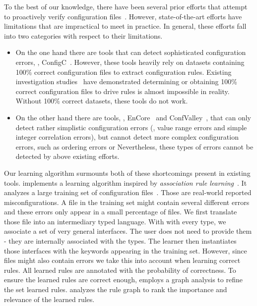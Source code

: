 To the best of our knowledge, there have been several prior efforts that attempt to proactively verify 
configuration files~\cite{santolucitoCAV, xu16early,
zhang14encore, huang15confvalley}.
However, state-of-the-art efforts have limitations that are impractical to meet in practice.
In general, these efforts fall into two categories with respect to their limitations.\begin{itemize}
\item On the one hand there are tools that can detect sophisticated 
configuration errors, \eg, ConfigC~\cite{santolucitoCAV}. 
However, these tools heavily rely on datasets containing 100\% 
correct configuration files to extract configuration rules.
Existing investigation studies~\cite{wang04automatic, yin11anempirical}
have demonstrated determining or obtaining 100\% correct configuration
files to drive rules is almost impossible in reality. 
Without 100\% correct datasets, these tools do not work.
\item On the other hand there are tools, 
\eg, EnCore~\cite{zhang14encore} and
ConfValley~\cite{huang15confvalley}, that can only 
detect rather simplistic configuration errors (\eg, value range errors 
and simple integer correlation errors), but cannot detect
more complex configuration errors, such as ordering errors or 
Nevertheless, these types of errors cannot be detected by above existing
efforts.
\end{itemize}

Our learning algorithm surmounts both of these shortcomings present in 
existing tools.  \app implements a learning
algorithm inspired by {\em association rule
learning}~\cite{agrawal1993mining}. It analyzes a large training set of configuration files~\cite{configdataset}. Those are real-world reported misconfigurations. A file in the training set might 
contain several different errors and these errors only appear 
in a small percentage of files. We first translate those file into an 
intermediary typed language. With with every type, we associate 
a set of very general interfaces. The user does not
need to provide them - they are internally associated with the types. The 
learner then instantiates those interfaces with the keywords appearing in 
the training set. However, since files might also contain errors we take 
this into account when learning correct rules. All learned rules are 
annotated with the probability of correctness.  
To ensure the learned rules are correct enough,
\app employs a graph analysis to refine the set learned rules.
\app analyzes the rule graph to rank the importance and relevance of the learned rules. 

